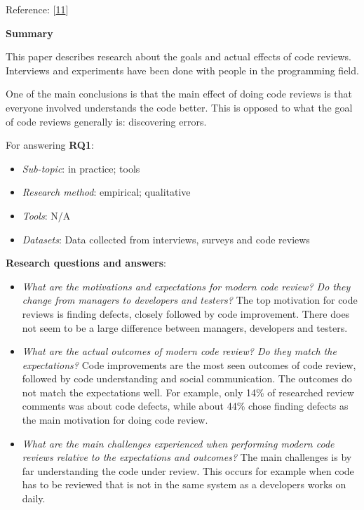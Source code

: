 \documentclass[]{book}
\providecommand{\tightlist}{%
  \setlength{\itemsep}{0pt}\setlength{\parskip}{0pt}}
\begin{document}
Reference: {[}\protect\hyperlink{ref-bacchelli2013expectations}{11}{]}

\textbf{Summary}

This paper describes research about the goals and actual effects of code
reviews. Interviews and experiments have been done with people in the
programming field.

One of the main conclusions is that the main effect of doing code
reviews is that everyone involved understands the code better. This is
opposed to what the goal of code reviews generally is: discovering
errors.

For answering \textbf{RQ1}:

\begin{itemize}
\tightlist
\item
  \emph{Sub-topic}: in practice; tools
\item
  \emph{Research method}: empirical; qualitative
\item
  \emph{Tools}: N/A
\item
  \emph{Datasets}: Data collected from interviews, surveys and code
  reviews
\end{itemize}

\textbf{Research questions and answers}:

\begin{itemize}
\tightlist
\item
  \emph{What are the motivations and expectations for modern code
  review? Do they change from managers to developers and testers?} The
  top motivation for code reviews is finding defects, closely followed
  by code improvement. There does not seem to be a large difference
  between managers, developers and testers.
\item
  \emph{What are the actual outcomes of modern code review? Do they
  match the expectations?} Code improvements are the most seen outcomes
  of code review, followed by code understanding and social
  communication. The outcomes do not match the expectations well. For
  example, only 14\% of researched review comments was about code
  defects, while about 44\% chose finding defects as the main motivation
  for doing code review.
\item
  \emph{What are the main challenges experienced when performing modern
  code reviews relative to the expectations and outcomes?} The main
  challenges is by far understanding the code under review. This occurs
  for example when code has to be reviewed that is not in the same
  system as a developers works on daily.
\end{itemize}
\end{document}
